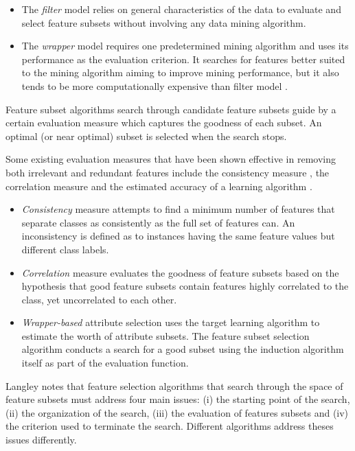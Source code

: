 \documentclass[]{book}
\begin{document}
\begin{itemize}
\item
  The \emph{filter} model relies on general characteristics of the data
  to evaluate and select feature subsets without involving any data
  mining algorithm.
\item
  The \emph{wrapper} model requires one predetermined mining algorithm
  and uses its performance as the evaluation criterion. It searches for
  features better suited to the mining algorithm aiming to improve
  mining performance, but it also tends to be more computationally
  expensive than filter model \citep[\citet{Lan94}]{KJ97}.
\end{itemize}

Feature subset algorithms search through candidate feature subsets guide
by a certain evaluation measure \citep{LM98} which captures the goodness
of each subset. An optimal (or near optimal) subset is selected when the
search stops.

Some existing evaluation measures that have been shown effective in
removing both irrelevant and redundant features include the consistency
measure \citep{DLM00}, the correlation measure \citep{Hal99} and the
estimated accuracy of a learning algorithm \citep{KJ97}.

\begin{itemize}
\item
  \emph{Consistency} measure attempts to find a minimum number of
  features that separate classes as consistently as the full set of
  features can. An inconsistency is defined as to instances having the
  same feature values but different class labels.
\item
  \emph{Correlation} measure evaluates the goodness of feature subsets
  based on the hypothesis that good feature subsets contain features
  highly correlated to the class, yet uncorrelated to each other.
\item
  \emph{Wrapper-based} attribute selection uses the target learning
  algorithm to estimate the worth of attribute subsets. The feature
  subset selection algorithm conducts a search for a good subset using
  the induction algorithm itself as part of the evaluation function.
\end{itemize}

Langley \citeyearpar{Lan94} notes that feature selection algorithms that
search through the space of feature subsets must address four main
issues: (i) the starting point of the search, (ii) the organization of
the search, (iii) the evaluation of features subsets and (iv) the
criterion used to terminate the search. Different algorithms address
theses issues differently.
\end{document}
